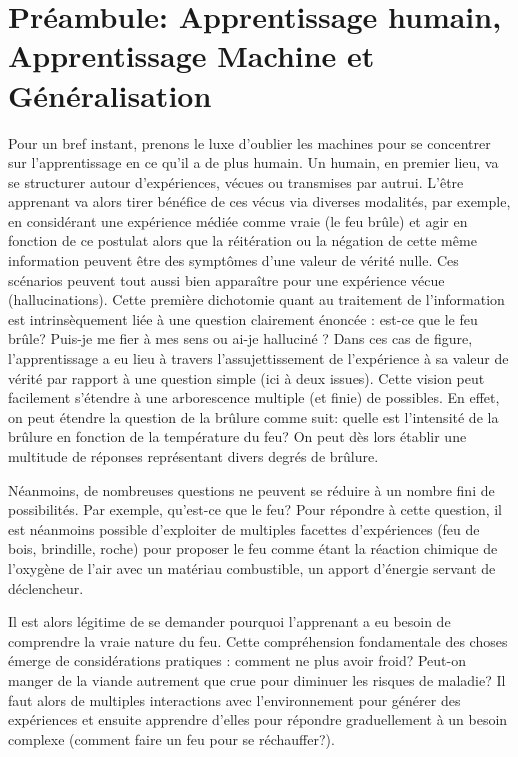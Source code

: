 \chapter*{Préambule: Apprentissage humain, Apprentissage Machine et Généralisation}
\mtcaddchapter


Pour un bref instant, prenons le luxe d'oublier les machines pour se concentrer sur l'apprentissage en ce qu'il a de plus humain. Un humain, en premier lieu, va se structurer autour d'expériences, vécues ou transmises par autrui. L'être apprenant va alors tirer bénéfice de ces vécus via diverses modalités, par exemple, en considérant une expérience médiée comme vraie (le feu brûle) et agir en fonction de ce postulat alors que la réitération ou la négation de cette même information peuvent être des symptômes d'une valeur de vérité nulle.  Ces scénarios peuvent tout aussi bien apparaître pour une expérience vécue (hallucinations). Cette première dichotomie quant au traitement de l'information est intrinsèquement liée à une question clairement énoncée : est-ce que le feu brûle? Puis-je me fier à mes sens ou ai-je halluciné ? Dans ces cas de figure, l'apprentissage a eu lieu à travers l'assujettissement de l'expérience à sa valeur de vérité par rapport à une question simple (ici à deux issues).  Cette vision peut facilement s'étendre à une arborescence multiple (et finie) de possibles. En effet, on peut étendre la question de la brûlure comme suit: quelle est l'intensité de la brûlure en fonction de la température du feu? On peut dès lors établir une multitude de réponses représentant divers degrés de brûlure.
  
 Néanmoins, de nombreuses questions ne peuvent se réduire à un nombre fini de possibilités. Par exemple, qu'est-ce que le feu? Pour répondre à cette question, il est néanmoins possible d'exploiter de multiples facettes d'expériences (feu de bois, brindille, roche) pour proposer le feu comme étant la réaction chimique de l'oxygène de l'air avec un matériau combustible, un apport d'énergie servant de déclencheur. 

Il est alors légitime de se demander pourquoi l'apprenant a eu besoin de comprendre la vraie nature du feu. Cette  compréhension fondamentale des choses émerge de considérations pratiques : comment ne plus avoir froid? Peut-on manger de la viande autrement que crue pour diminuer les risques de maladie? Il faut alors de multiples interactions avec l'environnement pour générer des expériences et ensuite apprendre d'elles pour répondre graduellement à un besoin complexe (comment faire un feu pour se réchauffer?).
    
